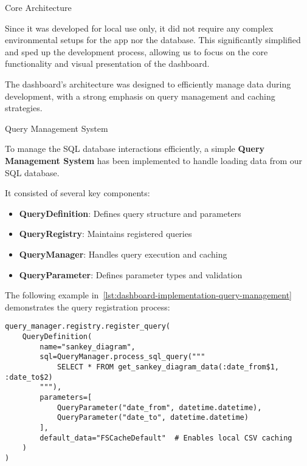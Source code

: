 \begin{section}{Core Architecture}
	\label{sec:implementation-core-architecture}

	Since it was developed for local use only, it did not require any complex environmental setups for the app nor the database.
	This significantly simplified and sped up the development process, allowing us to focus on the core functionality and visual presentation of the dashboard.

	The dashboard's architecture was designed to efficiently manage data during development, with a strong emphasis on query management and caching strategies.

	\begin{subsection}{Query Management System}
		\label{subsec:implementation-core-architecture-query-management}

		To manage the SQL database interactions efficiently, a simple \textbf{Query Management System} has been implemented to handle loading data from our SQL database.

		It consisted of several key components:
		\begin{itemize}
			\item \textbf{QueryDefinition}: Defines query structure and parameters
			\item \textbf{QueryRegistry}: Maintains registered queries
			\item \textbf{QueryManager}: Handles query execution and caching
			\item \textbf{QueryParameter}: Defines parameter types and validation
		\end{itemize}

		The following example in~\autoref{lst:dashboard-implementation-query-management} demonstrates the query registration process:

		\begin{listing}[H]
			\caption{Query Management Example}
			\begin{verbatim}
query_manager.registry.register_query(
    QueryDefinition(
        name="sankey_diagram",
        sql=QueryManager.process_sql_query("""
            SELECT * FROM get_sankey_diagram_data(:date_from$1, :date_to$2)
        """),
        parameters=[
            QueryParameter("date_from", datetime.datetime),
            QueryParameter("date_to", datetime.datetime)
        ],
        default_data="FSCacheDefault"  # Enables local CSV caching
    )
)
			\end{verbatim}
			\label{lst:dashboard-implementation-query-management}
		\end{listing}


\end{subsection}
\end{section}
